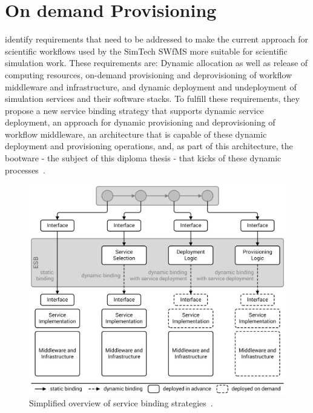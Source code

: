 \section{On demand Provisioning}
\label{related:ondemand}

\citeauthor{provisioning:ondemand} identify requirements that need to be addressed to make the current approach for scientific workflows used by the SimTech SWfMS more suitable for scientific simulation work.
These requirements are: Dynamic allocation as well as release of computing resources, on-demand provisioning and deprovisioning of workflow middleware and infrastructure, and dynamic deployment and undeployment of simulation services and their software stacks.
To fulfill these requirements, they propose a new service binding strategy that supports dynamic service deployment, an approach for dynamic provisioning and deprovisioning of workflow middleware, an architecture that is capable of these dynamic deployment and provisioning operations, and, as part of this architecture, the bootware - the subject of this diploma thesis - that kicks of these dynamic processes~\autocite{provisioning:ondemand}.

\begin{figure}[!htbp]
	\centering
	\includegraphics[resolution=600]{related/assets/service_binding_strategies}
	\caption{Simplified overview of service binding strategies~\autocite[based on][]{provisioning:ondemand}.}
	\label{image:service_binding_strategies}
\end{figure}

